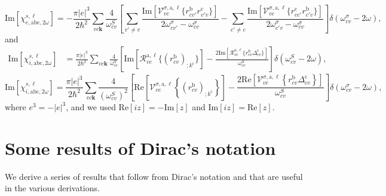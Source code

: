 \begin{equation}\label{c-calvimchie2wn}
\mathrm{Im}[\chi_{e,\mathrm{a}\mathrm{b}\mathrm{c},2\omega}^{s,\ell}] =
-\frac{\pi |e|^3}{2\hbar^2}\sum_{vc\mathbf{k}}\frac{4}{\omega^{S}_{cv}}
\left[
\sum_{v'\ne
  v}\frac{\mathrm{Im}[\mathcal{V}^{\sigma,\text{a},\ell}_{vc}\{r^{\mathrm{b}}_{cv'}r^{\mathrm{c}}_{v'v}\}]}
{2\omega^\sigma_{cv'}-\omega^\sigma_{cv}}
- \sum_{c'\ne
  c}\frac{\mathrm{Im}[\mathcal{V}^{\sigma,\text{a},\ell}_{vc}\{r^{\mathrm{c}}_{cc'}r^{\mathrm{b}}_{c'v}\}]}
{2\omega^\sigma_{c'v}-\omega^\sigma_{cv}}
\right]\delta(\omega^\sigma_{cv}-2\omega),
\end{equation}
 and
\begin{align}\label{imchi2wf}
\mathrm{Im}[\chi_{i,\mathrm{a}\mathrm{b}\mathrm{c},2\omega}^{s,\ell}]
&=
\frac{\pi|e|^3}{2\hbar^2}\sum_{vc\mathbf{k}}
\frac{4}{\omega^S_{cv}}
\left[
\mathrm{Im}[\mathcal{R}^{\mathrm{a},\ell}_{vc}\{\left(r^{\mathrm{b}}_{cv}\right)_{;k^{\mathrm{c}}}\}]
-
\frac{2\mathrm{Im}[\mathcal{R}^{\mathrm{a},\ell}_{vc}\{r^{\mathrm{b}}_{cv}\Delta^{\mathrm{c}}_{cv}\}]}{\omega^S_{cv}}
\right]\delta(\omega^S_{cv}-2\omega)
,
\end{align}
\begin{equation}\label{c-calvimchi2wn}
\mathrm{Im}[\chi_{i,\text{a}\text{b}\text{c},2\omega}^{s,\ell}] 
=
 \frac{\pi \vert
   e\vert^{3}}{2\hbar^2}\sum_{vc\mathbf{k}}\frac{4}{(\omega^{S}_{cv})^{2}}
\left[\mathrm{Re}\left[\mathcal{V}^{\sigma,\text{a},\ell}_{vc}\left\{\left(r^{\text{b}}_{cv}\right)_{;k^{\text{c}}}
\right\}\right] -
\frac{2\mathrm{Re}\left[\mathcal{V}^{\sigma,\text{a},\ell}_{vc}\left\{r^{\text{b}}_{cv}
\Delta^{\text{c}}_{cv}\right\}\right]}{\omega^{S}_{cv}}\right]\delta(\omega^\sigma_{cv}-2\omega)
,
\end{equation}
where $e^3=-|e|^3$, and we used 
$\mathrm{Re}[iz]=-\mathrm{Im}[z]$
and
$\mathrm{Im}[iz]=\mathrm{Re}[z]$.



\section{Some results of Dirac's notation}\label{ap_dirac}

We derive a series of results that follow from Dirac's notation and
that are  useful in the various derivations.

